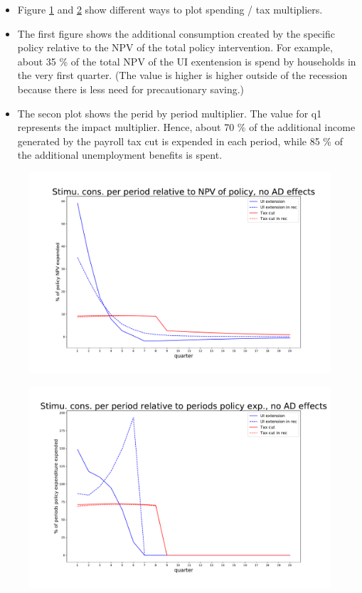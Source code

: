 \documentclass[]{article}
\begin{document}
\begin{itemize}
	\item Figure \ref{fig:npvmultipliernoad} and \ref{fig:periodmultipliernoad} show different ways to plot spending / tax multipliers.
	\item The first figure shows the additional consumption created by the specific policy relative to the NPV of the total policy intervention. For example, about 35 \% of the total NPV of the UI exentension is spend by households in the very first quarter. (The value is higher is higher outside of the recession because there is less need for precautionary saving.)
	\item The secon plot shows the perid by period multiplier. The value for q1 represents the impact multiplier. Hence, about 70 \% of the additional income generated by the payroll tax cut is expended in each period, while 85 \% of the additional unemployment benefits is spent.
\end{itemize}

\begin{figure}
	\centering
	\includegraphics[width=\linewidth]{../Full_Run_with_UI_Ext/NPV_Multiplier_no_AD}
	\caption{}
	\label{fig:npvmultipliernoad}
\end{figure}


\begin{figure}
	\centering
	\includegraphics[width=\linewidth]{../Full_Run_with_UI_Ext/Period_Multiplier_no_AD}
	\caption{}
	\label{fig:periodmultipliernoad}
\end{figure}
\end{document}

